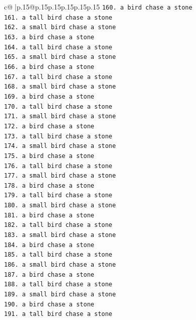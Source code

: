 \documentclass{article}
\begin{document}
{\begin{supertabular}{c@{$\;$}|p{.15\linewidth}@{}p{.15\linewidth}p{.15\linewidth}p{.15\linewidth}p{.15\linewidth}p{.15\linewidth}}
{{{\texttt{160. a bird chase a stone} \\
\texttt{161. a tall bird chase a stone} \\
\texttt{162. a small bird chase a stone} \\
\texttt{163. a bird chase a stone} \\
\texttt{164. a tall bird chase a stone} \\
\texttt{165. a small bird chase a stone} \\
\texttt{166. a bird chase a stone} \\
\texttt{167. a tall bird chase a stone} \\
\texttt{168. a small bird chase a stone} \\
\texttt{169. a bird chase a stone} \\
\texttt{170. a tall bird chase a stone} \\
\texttt{171. a small bird chase a stone} \\
\texttt{172. a bird chase a stone} \\
\texttt{173. a tall bird chase a stone} \\
\texttt{174. a small bird chase a stone} \\
\texttt{175. a bird chase a stone} \\
\texttt{176. a tall bird chase a stone} \\
\texttt{177. a small bird chase a stone} \\
\texttt{178. a bird chase a stone} \\
\texttt{179. a tall bird chase a stone} \\
\texttt{180. a small bird chase a stone} \\
\texttt{181. a bird chase a stone} \\
\texttt{182. a tall bird chase a stone} \\
\texttt{183. a small bird chase a stone} \\
\texttt{184. a bird chase a stone} \\
\texttt{185. a tall bird chase a stone} \\
\texttt{186. a small bird chase a stone} \\
\texttt{187. a bird chase a stone} \\
\texttt{188. a tall bird chase a stone} \\
\texttt{189. a small bird chase a stone} \\
\texttt{190. a bird chase a stone} \\
\texttt{191. a tall bird chase a stone} \\
}}}
\end{supertabular}}
\end{document}
